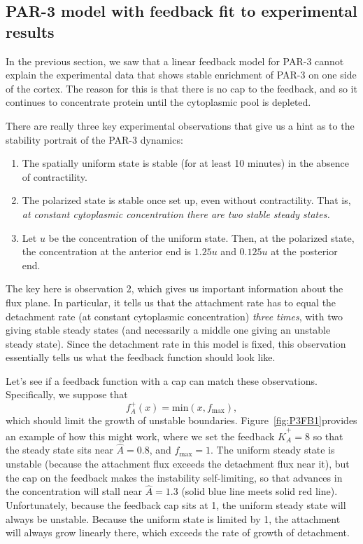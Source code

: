 \documentclass[11pt]{article}
\newcommand{\6}[1]{#1_{\text{6}}}
\newcommand{\3}[1]{#1_{\text{3}}}
\begin{document}
\subsection{PAR-3 model with feedback fit to experimental results}
In the previous section, we saw that a linear feedback model for PAR-3 cannot explain the experimental data that shows stable enrichment of PAR-3 on one side of the cortex. The reason for this is that there is no cap to the feedback, and so it continues to concentrate protein until the cytoplasmic pool is depleted. 

There are really three key experimental observations that give us a hint as to the stability portrait of the PAR-3 dynamics: 
\begin{enumerate}
\item The spatially uniform state is stable (for at least 10 minutes) in the absence of contractility. 
\item The polarized state is stable once set up, even without contractility. That is, \emph{at constant cytoplasmic concentration there are two stable steady states.}
\item Let $u$ be the concentration of the uniform state. Then, at the polarized state, the concentration at the anterior end is $1.25u$ and $0.125u$ at the posterior end. 
\end{enumerate}
The key here is observation 2, which gives us important information about the flux plane. In particular, it tells us that the attachment rate has to equal the detachment rate (at constant cytoplasmic concentration) \emph{three times}, with two giving stable steady states (and necessarily a middle one giving an unstable steady state). Since the detachment rate in this model is fixed, this observation essentially tells us what the feedback function should look like. 

Let's see if a feedback function with a cap can match these observations. Specifically, we suppose that $$f_A^+(x)=\text{min}\left(x,f_\text{max}\right),$$ which should limit the growth of unstable boundaries. Figure\ \ref{fig:P3FB1}provides an example of how this might work, where we set the feedback $\hat K_A^+=8$ so that the steady state sits near $\hat A = 0.8$, and $f_\text{max}=1$. The uniform steady state is unstable (because the attachment flux exceeds the detachment flux near it), but the cap on the feedback makes the instability self-limiting, so that advances in the concentration will stall near $\hat A=1.3$ (solid blue line meets solid red line). Unfortunately, because the feedback cap sits at 1, the uniform steady state will always be unstable. Because the uniform state is limited by 1, the attachment will always grow linearly there, which exceeds the rate of growth of detachment. 
\end{document}
